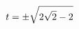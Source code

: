 \documentclass[preview]{standalone}
\begin{document}
\begin{align*}
\special{dvisvgm:raw <g id='unique000'>}t=\pm\sqrt{2\sqrt2-2}\special{dvisvgm:raw </g>}
\end{align*}
\end{document}
